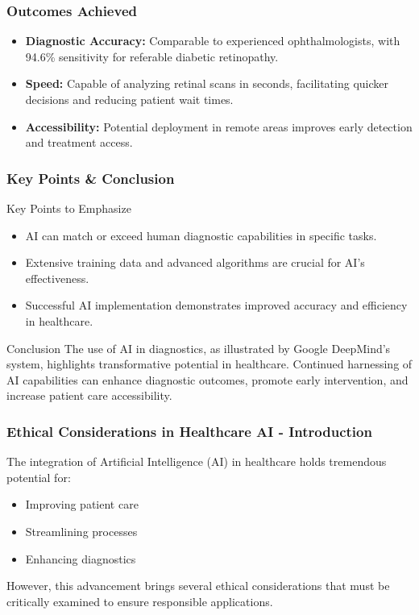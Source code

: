 \documentclass[aspectratio=169]{beamer}
\begin{document}
\begin{frame}[fragile]
    \frametitle{Outcomes Achieved}
    \begin{itemize}
        \item \textbf{Diagnostic Accuracy:} Comparable to experienced ophthalmologists, with 94.6\% sensitivity for referable diabetic retinopathy.
        \item \textbf{Speed:} Capable of analyzing retinal scans in seconds, facilitating quicker decisions and reducing patient wait times.
        \item \textbf{Accessibility:} Potential deployment in remote areas improves early detection and treatment access.
    \end{itemize}
\end{frame}

\begin{frame}[fragile]
    \frametitle{Key Points & Conclusion}
    \begin{block}{Key Points to Emphasize}
        \begin{itemize}
            \item AI can match or exceed human diagnostic capabilities in specific tasks.
            \item Extensive training data and advanced algorithms are crucial for AI's effectiveness.
            \item Successful AI implementation demonstrates improved accuracy and efficiency in healthcare.
        \end{itemize}
    \end{block}
    
    \begin{block}{Conclusion}
        The use of AI in diagnostics, as illustrated by Google DeepMind's system, highlights transformative potential in healthcare.
        Continued harnessing of AI capabilities can enhance diagnostic outcomes, promote early intervention, and increase patient care accessibility.
    \end{block}
\end{frame}

\begin{frame}[fragile]
    \frametitle{Ethical Considerations in Healthcare AI - Introduction}
    The integration of Artificial Intelligence (AI) in healthcare holds tremendous potential for:
    \begin{itemize}
        \item Improving patient care
        \item Streamlining processes
        \item Enhancing diagnostics
    \end{itemize}
    However, this advancement brings several ethical considerations that must be critically examined to ensure responsible applications.
\end{frame}
\end{document}
